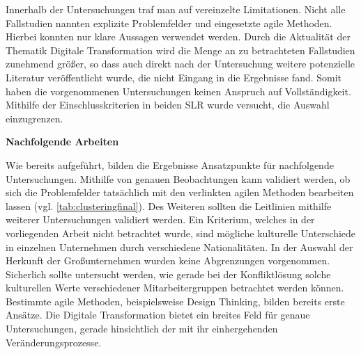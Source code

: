 Innerhalb der Untersuchungen traf man auf vereinzelte Limitationen. Nicht alle Fallstudien nannten explizite Problemfelder und eingesetzte agile Methoden. Hierbei konnten nur klare Aussagen verwendet werden. Durch die Aktualität der Thematik Digitale Transformation wird die Menge an zu betrachteten Fallstudien zunehmend größer, so dass auch direkt nach der Untersuchung weitere potenzielle Literatur veröffentlicht wurde, die nicht Eingang in die Ergebnisse fand. Somit haben die vorgenommenen Untersuchungen keinen Anspruch auf Vollständigkeit. Mithilfe der Einschlusskriterien in beiden SLR wurde versucht,  die Auswahl einzugrenzen.

\textbf{Nachfolgende Arbeiten} 

Wie bereits aufgeführt, bilden die Ergebnisse Ansatzpunkte für nachfolgende Untersuchungen. Mithilfe von genauen Beobachtungen kann validiert werden, ob sich die Problemfelder tatsächlich mit den verlinkten agilen Methoden bearbeiten lassen (vgl. \ref{tab:clusteringfinal}). Des Weiteren sollten die Leitlinien mithilfe weiterer Untersuchungen validiert werden. Ein Kriterium, welches in der vorliegenden Arbeit nicht betrachtet wurde, sind mögliche kulturelle Unterschiede in einzelnen Unternehmen durch verschiedene Nationalitäten. In der Auswahl der Herkunft der Großunternehmen wurden keine Abgrenzungen vorgenommen. Sicherlich sollte untersucht werden, wie gerade bei der Konfliktlösung solche kulturellen Werte verschiedener Mitarbeitergruppen betrachtet werden können. Bestimmte agile Methoden, beispielsweise Design Thinking, bilden bereits erste Ansätze. Die Digitale Transformation bietet ein breites Feld für genaue Untersuchungen, gerade hinsichtlich der mit ihr einhergehenden Veränderungsprozesse.